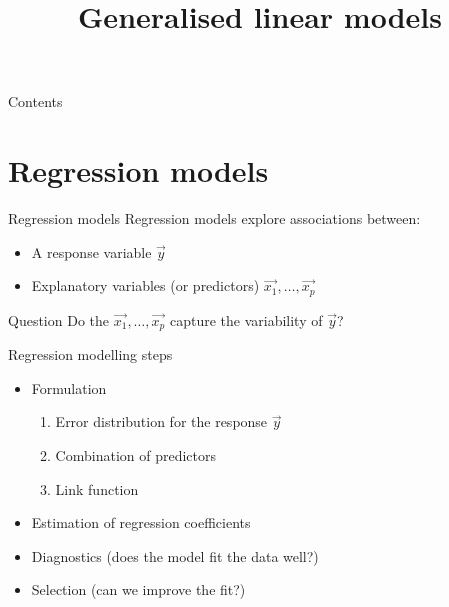 

\title{Generalised linear models}



\maketitle

\begin{frame}{Contents}
    \tableofcontents[hideallsubsections]
\end{frame}

\section{Regression models}

\begin{frame}{Regression models}
    Regression models explore associations between:
    \begin{itemize}
        \item A \alert{response} variable $\vec{y}$
        \item \alert{Explanatory} variables (or \alert{predictors})
              $\vec{x_{1}}, \ldots, \vec{x_{p}}$
    \end{itemize}
    \vfill\pause
    \begin{block}{Question}
        Do the $\vec{x_{1}}, \ldots, \vec{x_{p}}$ capture the
        \alert{variability} of $\vec{y}$?
    \end{block}
\end{frame}

\begin{frame}{Regression modelling steps}
    \begin{itemize}
        \item \alert{Formulation}
              \begin{enumerate}
                  \item Error distribution for the response $\vec{y}$
                  \item Combination of predictors
                  \item Link function \\[\bigskipamount]
              \end{enumerate}
        \item \alert{Estimation} of regression coefficients \\[\bigskipamount]
        \item \alert{Diagnostics} (does the model fit the data well?) \\[\bigskipamount]
        \item \alert{Selection} (can we improve the fit?)
    \end{itemize}
\end{frame}

